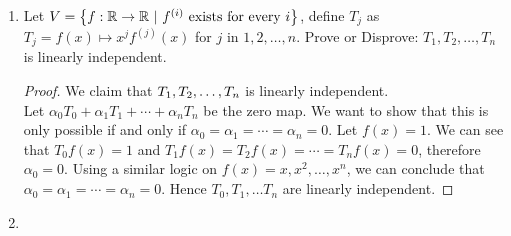\begin{enumerate}
    \item Let $V = \lb f: \b R \to \b R \ | \ f^{(i)} \text{ exists for every } i \rb$, define $T_j$ as $T_j = f(x) \mapsto x^{j} f^{(j)}(x)$ for $j$ in $1, 2, \ldots, n$. Prove or Disprove: $T_1, T_2, \ldots, T_n$ is linearly independent.
    \begin{proof}
        We claim that ${T}_1,{T}_2, \ldots, {T}_{n}$ is linearly independent. \\ 
        Let $\alpha_0 T_0 + \alpha_1 T_1 + \cdots + \alpha_n T_n$ be the zero map. We want to show that this is only possible if and only if $\alpha_0 = \alpha_1 = \cdots = \alpha_n = 0$.
        Let $f(x) = 1$. We can see that $T_0 f(x) = 1$ and $T_1 f(x) = T_2 f(x) = \cdots = T_n f(x) = 0$, therefore $\alpha_0 = 0$. Using a similar logic on $f(x) = x, x^2, \ldots, x^n$, we can conclude that $\alpha_0 = \alpha_1 = \cdots = \alpha_n = 0$. Hence $T_0, T_1, \ldots T_n$ are linearly independent.
    \end{proof}
    \item  
\end{enumerate}